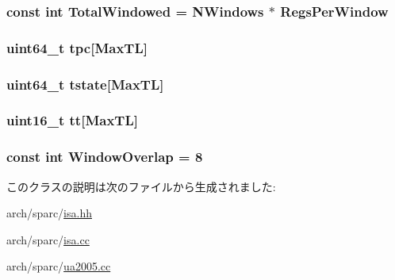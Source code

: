 \label{classSparcISA_1_1ISA_a0022a569233296cddbcb0862a16a0f06}
\hypertarget{classSparcISA_1_1ISA_afbaca3bf9771df45107bf33d834e3108}{
\subsubsection[{TotalWindowed}]{\setlength{\rightskip}{0pt plus 5cm}const int {\bf TotalWindowed} = {\bf NWindows} $\ast$ {\bf RegsPerWindow}}}
\label{classSparcISA_1_1ISA_afbaca3bf9771df45107bf33d834e3108}
\hypertarget{classSparcISA_1_1ISA_a9f38b96093eb2fa24e914d41ea4c2ff6}{
\subsubsection[{tpc}]{\setlength{\rightskip}{0pt plus 5cm}uint64\_\-t {\bf tpc}\mbox{[}{\bf MaxTL}\mbox{]}}}
\label{classSparcISA_1_1ISA_a9f38b96093eb2fa24e914d41ea4c2ff6}
\hypertarget{classSparcISA_1_1ISA_ab944f4fa2221eb756d169e0d1f1d38d8}{
\subsubsection[{tstate}]{\setlength{\rightskip}{0pt plus 5cm}uint64\_\-t {\bf tstate}\mbox{[}{\bf MaxTL}\mbox{]}}}
\label{classSparcISA_1_1ISA_ab944f4fa2221eb756d169e0d1f1d38d8}
\hypertarget{classSparcISA_1_1ISA_a17e4289d606d8e516baaf88a4fac1440}{
\subsubsection[{tt}]{\setlength{\rightskip}{0pt plus 5cm}uint16\_\-t {\bf tt}\mbox{[}{\bf MaxTL}\mbox{]}}}
\label{classSparcISA_1_1ISA_a17e4289d606d8e516baaf88a4fac1440}
\hypertarget{classSparcISA_1_1ISA_aca1beb46289722aec38d4b6c230d6d50}{
\subsubsection[{WindowOverlap}]{\setlength{\rightskip}{0pt plus 5cm}const int {\bf WindowOverlap} = 8}}
\label{classSparcISA_1_1ISA_aca1beb46289722aec38d4b6c230d6d50}


このクラスの説明は次のファイルから生成されました:\begin{DoxyCompactItemize}
\item 
arch/sparc/\hyperlink{sparc_2isa_8hh}{isa.hh}\item 
arch/sparc/\hyperlink{sparc_2isa_8cc}{isa.cc}\item 
arch/sparc/\hyperlink{ua2005_8cc}{ua2005.cc}\end{DoxyCompactItemize}
